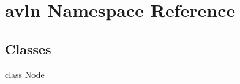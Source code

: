 \hypertarget{namespaceavln}{}\section{avln Namespace Reference}
\label{namespaceavln}
\subsection*{Classes}
\begin{DoxyCompactItemize}
\item 
class \hyperlink{classavln_1_1_node}{Node}
\end{DoxyCompactItemize}
